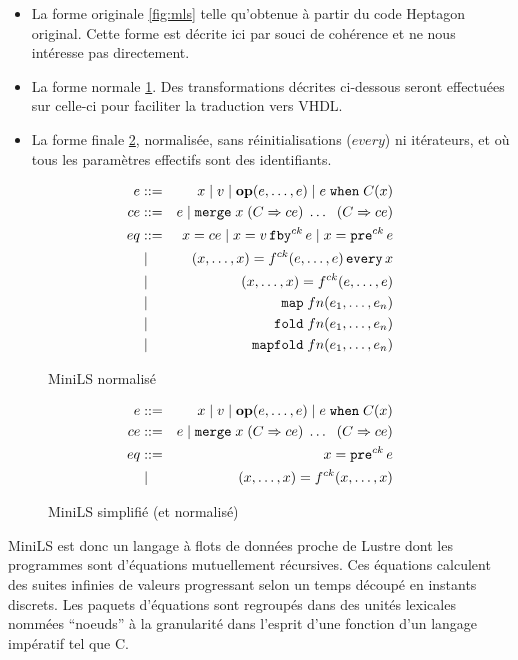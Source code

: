 \documentclass[a4paper]{article}
\newcommand{\LANG}{Heptagon}
\newcommand{\p}[0]{\; \vert \;}
\newcommand{\mybox}[1]{\mbox{\tt{#1}}}
\newcommand{\Coloneqq}[0]{::=}
\newcommand{\Op}[2]{\mybox{\bf{op}}(#1,\dots,#2)}
\newcommand{\Fby}[2]{#1 \, \mybox{fby}^{ck} \, #2}
\newcommand{\Pre}[1]{\mybox{pre}^{ck} \, #1}
\newcommand{\Every}[4]{#1^{ck}(#2,\dots,#3) \, \mybox{every} \, #4}
\newcommand{\App}[2]{#1^{ck}(#2)}
\newcommand{\When}[3]{#1 \; \mybox{when} \; #2(#3)}
\newcommand{\Merge}[5]{\mybox{merge} \; #1 \; (#2 \Rightarrow #3) \; \dots \; \
  (#4 \Rightarrow #5)}
\newcommand{\Map}[3]{\mathtt{map} \; #1 n (#2,\dots,#3)}
\newcommand{\Fold}[3]{\mathtt{fold} \; #1 n (#2,\dots,#3)}
\newcommand{\Mapfold}[3]{\mathtt{mapfold} \; #1 n (#2,\dots,#3)}
\begin{document}
\begin{itemize}
\item La forme originale \ref{fig:mls} telle qu'obtenue \`a partir du code
  \LANG{} original. Cette forme est décrite ici par souci de cohérence et ne
  nous intéresse pas directement.
\item La forme normale \ref{fig:mlsn}. Des transformations décrites ci-dessous
  seront effectuées sur celle-ci pour faciliter la traduction vers VHDL.
\item La forme finale \ref{fig:mlsns}, normalis\'ee, sans r\'einitialisations
  ($every$) ni it\'erateurs, et o\`u tous les param\`etres effectifs sont des
  identifiants.
\end{itemize}

\begin{figure}[htp]
  \centering
  \begin{eqnarray*}
    e & \Coloneqq & x \p v \p \Op{e}{e} \p \When{e}{C}{x} \\
    ce & \Coloneqq & e \p \Merge{x}{C}{ce}{C}{ce} \\
    eq & \Coloneqq & x = ce \p x = \Fby{v}{e} \p x = \Pre{e} \\
    & \p & (x,\dots,x) = \Every{f}{e}{e}{x} \\
    & \p & (x,\dots,x) = \App{f}{e,\dots,e} \\
    & \p & \Map{f}{e_1}{e_n} \\
    & \p & \Fold{f}{e_1}{e_n} \\
    & \p & \Mapfold{f}{e_1}{e_n}
  \end{eqnarray*}
  \caption{MiniLS normalis\'e}
  \label{fig:mlsn}
\end{figure}

\begin{figure}[htp]
  \centering
  \begin{eqnarray*}
    e & \Coloneqq & x \p v \p \Op{e}{e} \p \When{e}{C}{x} \\
    ce & \Coloneqq & e \p \Merge{x}{C}{ce}{C}{ce} \\
    eq & \Coloneqq & x = \Pre{e} \\
    & \p & (x,\dots,x) = \App{f}{x,\dots,x}
  \end{eqnarray*}
  \caption{MiniLS simplifi\'e (et normalis\'e)}
  \label{fig:mlsns}
\end{figure}

MiniLS est donc un langage à flots de données proche de Lustre dont les
programmes sont d'équations mutuellement récursives. Ces équations calculent des
suites infinies de valeurs progressant selon un temps découpé en instants
discrets.  Les paquets d'équations sont regroupés dans des unités lexicales
nommées ``noeuds'' à la granularité dans l'esprit d'une fonction d'un langage
impératif tel que C.
\end{document}
